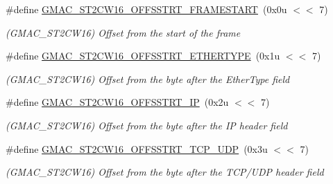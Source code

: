 \begin{DoxyCompactItemize}
\item 
\mbox{\label{group__SAME70__GMAC_ga3505c9b88aae232779b3c9e07b45c136}} 
\#define \mbox{\hyperlink{group__SAME70__GMAC_ga3505c9b88aae232779b3c9e07b45c136}{G\+M\+A\+C\+\_\+\+S\+T2\+C\+W16\+\_\+\+O\+F\+F\+S\+S\+T\+R\+T\+\_\+\+F\+R\+A\+M\+E\+S\+T\+A\+RT}}~(0x0u $<$$<$ 7)
\begin{DoxyCompactList}\small\item\em (G\+M\+A\+C\+\_\+\+S\+T2\+C\+W16) Offset from the start of the frame \end{DoxyCompactList}\item 
\mbox{\label{group__SAME70__GMAC_gaa5c5294e5b80744a89e0d03c7c5910ab}} 
\#define \mbox{\hyperlink{group__SAME70__GMAC_gaa5c5294e5b80744a89e0d03c7c5910ab}{G\+M\+A\+C\+\_\+\+S\+T2\+C\+W16\+\_\+\+O\+F\+F\+S\+S\+T\+R\+T\+\_\+\+E\+T\+H\+E\+R\+T\+Y\+PE}}~(0x1u $<$$<$ 7)
\begin{DoxyCompactList}\small\item\em (G\+M\+A\+C\+\_\+\+S\+T2\+C\+W16) Offset from the byte after the Ether\+Type field \end{DoxyCompactList}\item 
\mbox{\label{group__SAME70__GMAC_ga9ae3e85a4563be1569cbac26ee299275}} 
\#define \mbox{\hyperlink{group__SAME70__GMAC_ga9ae3e85a4563be1569cbac26ee299275}{G\+M\+A\+C\+\_\+\+S\+T2\+C\+W16\+\_\+\+O\+F\+F\+S\+S\+T\+R\+T\+\_\+\+IP}}~(0x2u $<$$<$ 7)
\begin{DoxyCompactList}\small\item\em (G\+M\+A\+C\+\_\+\+S\+T2\+C\+W16) Offset from the byte after the IP header field \end{DoxyCompactList}\item 
\mbox{\label{group__SAME70__GMAC_gae18a6da2881614087005a5ced938f337}} 
\#define \mbox{\hyperlink{group__SAME70__GMAC_gae18a6da2881614087005a5ced938f337}{G\+M\+A\+C\+\_\+\+S\+T2\+C\+W16\+\_\+\+O\+F\+F\+S\+S\+T\+R\+T\+\_\+\+T\+C\+P\+\_\+\+U\+DP}}~(0x3u $<$$<$ 7)
\begin{DoxyCompactList}\small\item\em (G\+M\+A\+C\+\_\+\+S\+T2\+C\+W16) Offset from the byte after the T\+C\+P/\+U\+DP header field \end{DoxyCompactList}\item 
\mbox{\label{group__SAME70__GMAC_ga9cb745b020ba6dda0fcd4e79466c1eae}} 

\end{DoxyCompactItemize}
